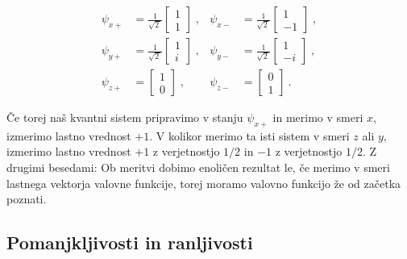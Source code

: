 \documentclass[12pt]{article}
\begin{document}
\begin{equation}
\label{eigenvectors}
{\displaystyle {\begin{aligned}\psi _{x+}&={\frac {1}{\sqrt {2\,}}}{\begin{bmatrix}1\\1\end{bmatrix}}\;,&\psi _{x-}&={\frac {1}{\sqrt {2\,}}}{\begin{bmatrix}1\\-1\end{bmatrix}}\;,\\\psi _{y+}&={\frac {1}{\sqrt {2\,}}}{\begin{bmatrix}1\\i\end{bmatrix}}\;,&\psi _{y-}&={\frac {1}{\sqrt {2\,}}}{\begin{bmatrix}1\\-i\end{bmatrix}}\;,\\\psi _{z+}&={\begin{bmatrix}1\\0\end{bmatrix}}\;,&\psi _{z-}&={\begin{bmatrix}0\\1\end{bmatrix}}~.\end{aligned}}}
\end{equation}

\par Če torej naš kvantni sistem pripravimo v stanju $\psi_{x+}$ in merimo v smeri $x$, izmerimo lastno vrednost $+1$. V kolikor merimo ta isti sistem v smeri $z$ ali $y$, izmerimo lastno vrednost $+1$ z verjetnostjo $1/2$ in $-1$ z verjetnostjo $1/2$. Z drugimi besedami: Ob meritvi dobimo enoličen rezultat le, če merimo v smeri lastnega vektorja valovne funkcije, torej moramo valovno funkcijo že od začetka poznati. 

\subsection{Pomanjkljivosti in ranljivosti}
\end{document}
